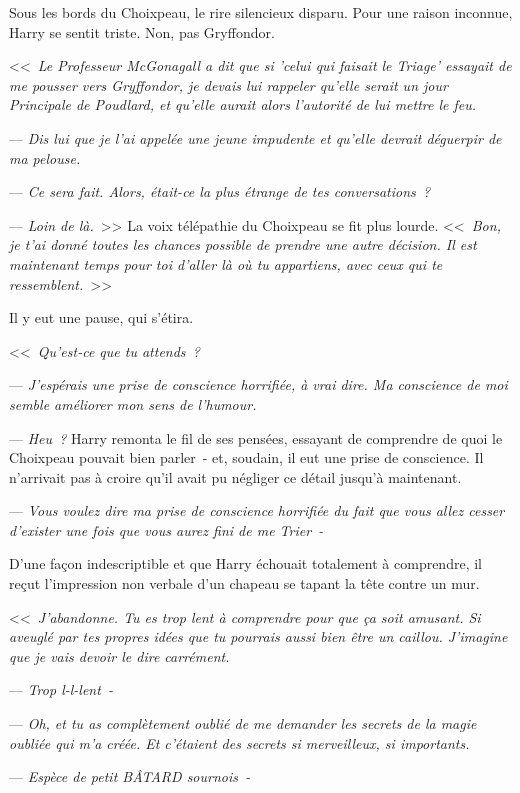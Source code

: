 Sous les bords du Choixpeau, le rire silencieux disparu. Pour une raison inconnue, Harry se sentit triste. Non, pas Gryffondor.

<<~\emph{Le Professeur McGonagall a dit que si 'celui qui faisait le Triage' essayait de me pousser vers Gryffondor, je devais lui rappeler qu'elle serait un jour Principale de Poudlard, et qu'elle aurait alors l'autorité de lui mettre le feu.}

--- \emph{Dis lui que je l'ai appelée une jeune impudente et qu'elle devrait déguerpir de ma pelouse.}

--- \emph{Ce sera fait. Alors, était-ce la plus étrange de tes conversations~?}

--- \emph{Loin de là.}~>> La voix télépathie du Choixpeau se fit plus lourde. <<~\emph{Bon, je t'ai donné toutes les chances possible de prendre une autre décision. Il est maintenant temps pour toi d'aller là où tu appartiens, avec ceux qui te ressemblent.}~>>

Il y eut une pause, qui s'étira.

<<~\emph{Qu'est-ce que tu attends~?}

--- \emph{J'espérais une prise de conscience horrifiée, à vrai dire. Ma conscience de moi semble améliorer mon sens de l'humour.}

--- \emph{Heu~?} Harry remonta le fil de ses pensées, essayant de comprendre de quoi le Choixpeau pouvait bien parler~- et, soudain, il eut une prise de conscience. Il n'arrivait pas à croire qu'il avait pu négliger ce détail jusqu'à maintenant.

--- \emph{Vous voulez dire ma prise de conscience horrifiée du fait que vous allez cesser d'exister une fois que vous aurez fini de me Trier~-}

D'une façon indescriptible et que Harry échouait totalement à comprendre, il reçut l'impression non verbale d'un chapeau se tapant la tête contre un mur.

<<~\emph{J'abandonne. Tu es trop lent à comprendre pour que ça soit amusant. Si aveuglé par tes propres idées que tu pourrais aussi bien être un caillou. J'imagine que je vais devoir le dire carrément.}

--- \emph{Trop l-l-lent~-}

--- \emph{Oh, et tu as complètement oublié de me demander les secrets de la magie oubliée qui m'a créée. Et c'étaient des secrets si merveilleux, si importants.}

--- \emph{Espèce de petit BÂTARD sournois~-}

